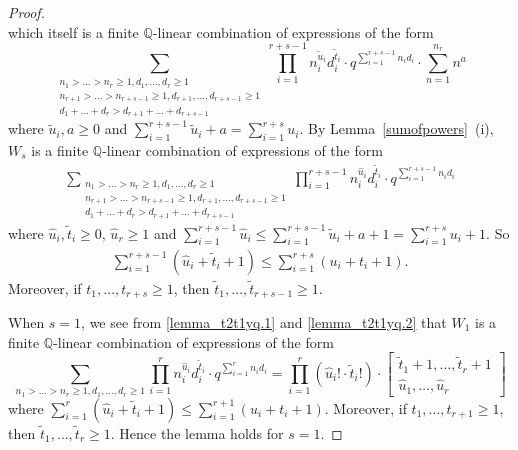 \documentclass[12pt, reqno]{amsart}
\theoremstyle{definition}
\theoremstyle{remark}
\numberwithin{equation}{section}
\newcommand{\Q}{ \mathbb Q }
\newcommand{\w}{\tilde}
\numberwithin{equation}{section}
\begin{document}
\begin{proof}
$$$$
which itself is a finite $\Q$-linear combination of expressions of the form
$$
\sum_{\substack{n_1 > \ldots > n_r \ge 1, d_1, \ldots, d_r \ge 1\\
    n_{r+1} > \ldots > n_{r+s-1} \ge 1, d_{r+1}, \ldots, d_{r+s-1} \ge 1\\
    d_1+ \ldots + d_r > d_{r+1} + \ldots + d_{r+s-1}}}
   \prod_{i=1}^{r+s-1} n_i^{\w u_i}d_i^{\w t_i}  
   \cdot q^{\sum_{i=1}^{r+s-1} n_i d_i} \cdot \sum_{n=1}^{n_r} n^a
$$
where $\w u_i, a \ge 0$ and $\sum_{i=1}^{r+s-1} \w u_i +a 
= \sum_{i=1}^{r+s} u_i$. By Lemma~\ref{sumofpowers}~(i), 
$W_s$ is a finite $\Q$-linear combination of expressions of the form
\begin{eqnarray}  \label{lemma_t2t1yq.1}
\sum_{\substack{n_1 > \ldots > n_r \ge 1, d_1, \ldots, d_r \ge 1\\
    n_{r+1} > \ldots > n_{r+s-1} \ge 1, d_{r+1}, \ldots, d_{r+s-1} \ge 1\\
    d_1+ \ldots + d_r > d_{r+1} + \ldots + d_{r+s-1}}}
   \prod_{i=1}^{r+s-1} n_i^{\hat u_i}d_i^{\w t_i}  
   \cdot q^{\sum_{i=1}^{r+s-1} n_i d_i}
\end{eqnarray}
where $\hat u_i, \w t_i \ge 0$, $\hat u_r \ge 1$ and 
$\sum_{i=1}^{r+s-1} \hat u_i \le 
\sum_{i=1}^{r+s-1} \w u_i +a + 1 = \sum_{i=1}^{r+s} u_i + 1$. So
\begin{eqnarray}  \label{lemma_t2t1yq.2}
\sum_{i=1}^{r+s-1} (\hat u_i + \w t_i + 1)   
\le \sum_{i=1}^{r+s} (u_i + t_i + 1).
\end{eqnarray}
Moreover,
if $t_1, \ldots, t_{r+s} \ge 1$, then $\w t_1, \ldots, \w t_{r+s-1} \ge 1$. 

When $s=1$, we see from \eqref{lemma_t2t1yq.1} and \eqref{lemma_t2t1yq.2}
that $W_1$ is a finite $\Q$-linear combination of expressions of the form
$$
\sum_{n_1 > \ldots > n_r \ge 1, d_1, \ldots, d_r \ge 1}
   \prod_{i=1}^{r} n_i^{\hat u_i}d_i^{\w t_i}  
   \cdot q^{\sum_{i=1}^{r} n_i d_i}
= \prod_{i=1}^{r} (\hat u_i! \cdot \w t_i!) \cdot 
   \begin{bmatrix} \w t_1 + 1, \ldots, \w t_r + 1\\
     \hat u_1, \ldots, \hat u_r 
   \end{bmatrix}
$$
where $\sum_{i=1}^{r} (\hat u_i + \w t_i + 1)   
\le \sum_{i=1}^{r+1} (u_i + t_i + 1)$. Moreover,
if $t_1, \ldots, t_{r+1} \ge 1$, then $\w t_1, \ldots, \w t_{r} \ge 1$. 
Hence the lemma holds for $s=1$.


\end{proof}
\end{document}
